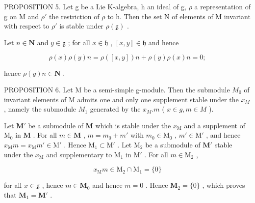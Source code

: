 PROPOSITION 5. Let g be a Lie K-algebra, h an ideal of g, \(\rho\) a representation of g on M and \(\rho'\) the restriction of \(\rho\) to h. Then the set N of elements of M invariant with respect to \(\rho'\) is stable under \(\rho(\mathfrak{g})\) .

Let \(n\in \mathbf{N}\) and \(y\in \mathfrak{g}\) ; for all \(x\in \mathfrak{h}\) , \([x,y]\in \mathfrak{h}\) and hence

\[
\rho (x) \rho (y) n = \rho ([ x, y ]) n + \rho (y) \rho (x) n = 0;
\]

hence \(\rho(y)n\in\mathbf{N}\) .

PROPOSITION 6. Let M be a semi-simple g-module. Then the submodule \(M_{0}\) of invariant elements of M admits one and only one supplement stable under the \(x_{M}\) , namely the submodule \(M_{1}\) generated by the \(x_{M}.m\) ( \(x \in g, m \in M\) ).

Let \(\mathbf{M}'\) be a submodule of \(\mathbf{M}\) which is stable under the \(x_{\mathrm{M}}\) and a supplement of \(\mathrm{M}_0\) in \(\mathbf{M}\) . For all \(m \in \mathbf{M}\) , \(m = m_0 + m'\) with \(m_0 \in \mathrm{M}_0\) , \(m' \in \mathrm{M}'\) , and hence \(x_{\mathrm{M}}m = x_{\mathrm{M}}m' \in \mathrm{M}'\) . Hence \(\mathrm{M}_1 \subset \mathrm{M}'\) . Let \(\mathrm{M}_2\) be a submodule of \(\mathbf{M}'\) stable under the \(x_{\mathrm{M}}\) and supplementary to \(\mathrm{M}_1\) in \(\mathrm{M}'\) . For all \(m \in \mathrm{M}_2\) ,

\[
x _ {\mathrm{M}} m \in \mathrm{M} _ {2} \cap \mathrm{M} _ {1} = \{0 \}
\]

for all \(x \in \mathfrak{g}\) , hence \(m \in \mathbf{M}_0\) and hence \(m = 0\) . Hence \(\mathbf{M}_2 = \{0\}\) , which proves that \(\mathbf{M}_1 = \mathbf{M}'\) .

